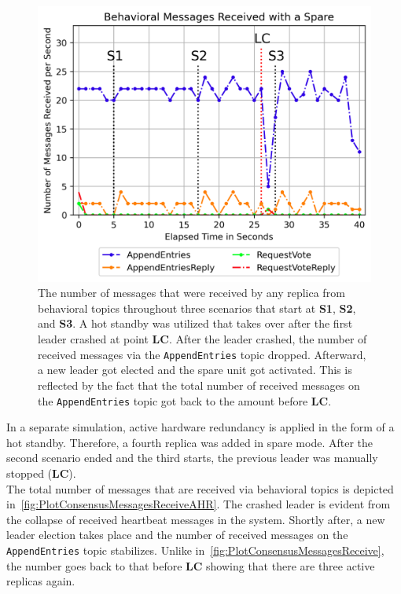 \begin{figure}[!hb]
	\centering
	\includegraphics[width=0.8\linewidth]{images/plots/ConsensusMessagesReceiveAHR}
	\caption{The number of messages that were received by any replica from behavioral topics throughout three scenarios that start at \textbf{S1}, \textbf{S2}, and \textbf{S3}. A hot standby was utilized that takes over after the first leader crashed at point \textbf{LC}. After the leader crashed, the number of received messages via the \texttt{AppendEntries} topic dropped. Afterward, a new leader got elected and the spare unit got activated. This is reflected by the fact that the total number of received messages on the \texttt{AppendEntries} topic got back to the amount before \textbf{LC}.}
	\label{fig:PlotConsensusMessagesReceiveAHR}
\end{figure}

In a separate simulation, active hardware redundancy is applied in the form of a hot standby.
Therefore, a fourth replica was added in spare mode.
After the second scenario ended and the third starts, the previous leader was manually stopped (\textbf{LC}).
\\

The total number of messages that are received via behavioral topics is depicted in~\autoref{fig:PlotConsensusMessagesReceiveAHR}.
The crashed leader is evident from the collapse of received heartbeat messages in the system.
Shortly after, a new leader election takes place and the number of received messages on the \texttt{AppendEntries} topic stabilizes.
Unlike in~\autoref{fig:PlotConsensusMessagesReceive}, the number goes back to that before \textbf{LC} showing that there are three active replicas again.


